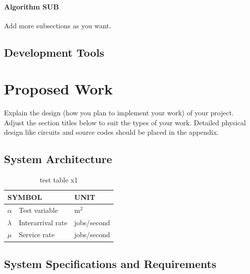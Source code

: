 \documentclass[12pt,oneside,openright,a4paper]{cpe-english-project}
\begin{document}
\subsubsection{Algorithm SUB}
Add more subsections as you want.


\section{Development Tools}

\chapter{Proposed Work}

Explain the design (how you plan to implement your work) of your project. Adjust the section titles below to suit the types of your work. Detailed physical design like circuits and source codes should be placed in the appendix.

\section{System Architecture}

\begin{table}[!h]
\centering
\caption{test table x1}\label{tbl:symbols}
\begin{tabular}{@{}p{}|p{}p{}}\hline
\multicolumn{2}{l}{\textbf{SYMBOL}}  & \textbf{UNIT} \\ \hline 
$\alpha$ & Test variable\hfill & m$^2$ \\
$\lambda$ & Interarrival rate\hfill &  jobs/second\\
$\mu$ & Service rate\hfill & jobs/second \\ \hline
\end{tabular}
\end{table}

\section{System Specifications and Requirements}
\end{document}
